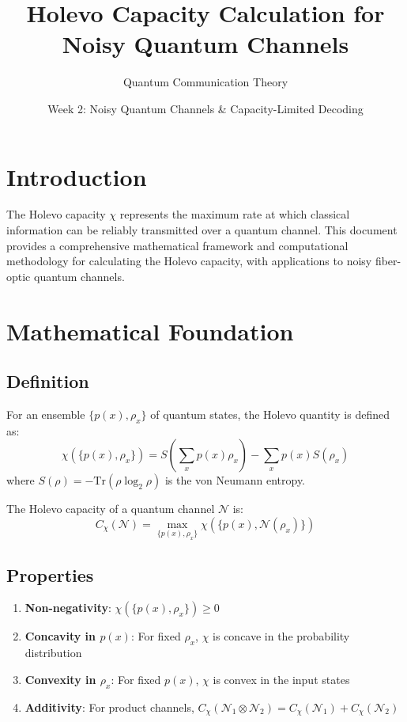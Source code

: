\documentclass[12pt]{article}
\title{Holevo Capacity Calculation for Noisy Quantum Channels}
\author{Quantum Communication Theory}
\date{Week 2: Noisy Quantum Channels \& Capacity-Limited Decoding}
\begin{document}
\maketitle

\section{Introduction}
The Holevo capacity $\chi$ represents the maximum rate at which classical information can be reliably transmitted over a quantum channel. This document provides a comprehensive mathematical framework and computational methodology for calculating the Holevo capacity, with applications to noisy fiber-optic quantum channels.

\section{Mathematical Foundation}

\subsection{Definition}
For an ensemble $\{p(x), \rho_x\}$ of quantum states, the Holevo quantity is defined as:
\begin{equation}
\chi(\{p(x), \rho_x\}) = S\left( \sum_{x} p(x) \rho_x \right) - \sum_{x} p(x) S(\rho_x)
\label{eq:holevo_quantity}
\end{equation}
where $S(\rho) = -\text{Tr}(\rho \log_2 \rho)$ is the von Neumann entropy.

The Holevo capacity of a quantum channel $\mathcal{N}$ is:
\begin{equation}
C_{\chi}(\mathcal{N}) = \max_{\{p(x), \rho_x\}} \chi(\{p(x), \mathcal{N}(\rho_x)\})
\label{eq:holevo_capacity}
\end{equation}

\subsection{Properties}
\begin{enumerate}
    \item \textbf{Non-negativity}: $\chi(\{p(x), \rho_x\}) \geq 0$
    \item \textbf{Concavity in $p(x)$}: For fixed $\rho_x$, $\chi$ is concave in the probability distribution
    \item \textbf{Convexity in $\rho_x$}: For fixed $p(x)$, $\chi$ is convex in the input states
    \item \textbf{Additivity}: For product channels, $C_{\chi}(\mathcal{N}_1 \otimes \mathcal{N}_2) = C_{\chi}(\mathcal{N}_1) + C_{\chi}(\mathcal{N}_2)$
\end{enumerate}
\end{document}
